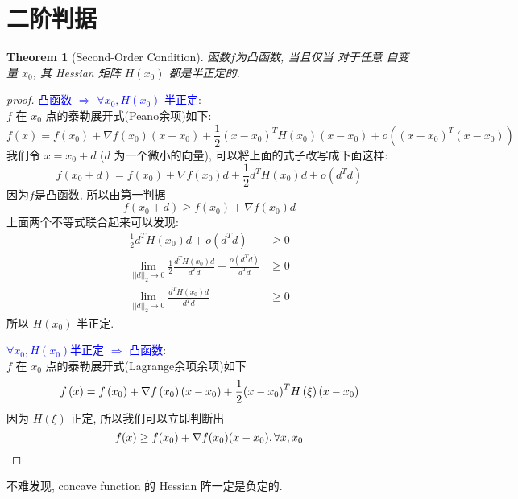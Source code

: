 \documentclass{article}
\newtheorem{theorem}{Theorem}
\begin{document}
\section{二阶判据}
\begin{theorem}[Second-Order Condition]
  函数$f$为凸函数, 当且仅当 对于任意 自变量 $x_0$, 其 Hessian 矩阵 $H(x_0)$ 都是半正定的.
\end{theorem}
\begin{proof}[proof]
  \textcolor{blue}{凸函数 $\Rightarrow$ $\forall x_0, H(x_0)$ 半正定}:\\
  $f$ 在 $x_0$ 点的泰勒展开式(Peano余项)如下:
  \[f\left({x}\right) = f\left( {x}_0 \right) + \nabla f\left( {x}_0 \right)\left( {x} - {x}_0 \right) + \frac{1}{2} \left( {x} - {x}_0 \right)^T {H}\left( {x}_0 \right) \left({x} - {x}_0 \right) + o\left( \left({x} - {x}_0 \right)^T \left( {x} - {x}_0 \right) \right)\]
  我们令 $x = x_0 + d$ ($d$ 为一个微小的向量), 可以将上面的式子改写成下面这样:
  \[f\left( {x}_0 + {d} \right) = f\left( {x}_0 \right) + \nabla f\left( {x}_0 \right){d} + \frac{1}{2} {d}^T {H}\left( {x}_0 \right) {d} + o\left( d^Td \right)\]
  因为$f$是凸函数, 所以由第一判据
  \[f(x_0 + d) \geq f(x_0) + \nabla f(x_0) d\]
  上面两个不等式联合起来可以发现:
  \begin{align*}
    \frac{1}{2} {d}^T {H}\left( {x}_0 \right) {d} + o\left( d^Td \right) &\geq 0 \\
    \lim_{||d||_2 \to 0}\frac{1}{2} \frac{{d}^T {H}\left( {x}_0 \right) {d}}{d^Td} + \frac{o\left( d^Td \right)}{d^Td} &\geq 0 \\
    \lim_{||d||_2 \to 0}\frac{{d}^T {H}\left( {x}_0 \right) {d}}{d^Td} &\geq 0
  \end{align*}
  所以 $H(x_0)$ 半正定.

  \textcolor{blue}{$\forall x_0, H(x_0)$半正定 $\Rightarrow$ 凸函数}:\\
  $f$ 在 $x_0$ 点的泰勒展开式(Lagrange余项余项)如下
  \[f\left( {x} \right) = f\left( {x}_0 \right) + \nabla f\left( {x}_0 \right)\left( {x} - {x}_0 \right) + \frac{1}{2}{\left( {x} - {x}_0 \right)^T}{H}\left( {\bf{\xi }} \right)\left( {x} - {x}_0 \right)\]
  因为 $H(\xi)$ 正定, 所以我们可以立即判断出
  \[f(x) \geq f(x_0) + \nabla f(x_0) (x - x_0), \forall x, x_0 \qedhere\]
\end{proof}

不难发现, concave function 的 Hessian 阵一定是负定的.
\end{document}
